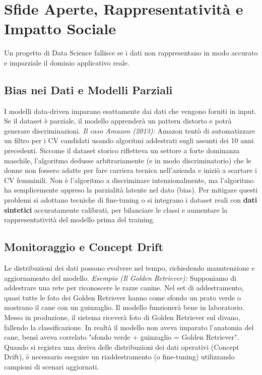 \section{Sfide Aperte, Rappresentatività e Impatto Sociale}
Un progetto di Data Science fallisce se i dati non rappresentano in modo accurato e imparziale il dominio applicativo reale. 

\subsection{Bias nei Dati e Modelli Parziali}
I modelli data-driven imparano esattamente dai dati che vengono forniti in input. Se il dataset è parziale, il modello apprenderà un pattern distorto e potrà generare discriminazioni. 
\textit{Il caso Amazon (2013):} Amazon tentò di automatizzare un filtro per i CV candidati usando algoritmi addestrati sugli assunti dei 10 anni precedenti. Siccome il dataset storico rifletteva un settore a forte dominanza maschile, l'algoritmo dedusse arbitrariamente (e in modo discriminatorio) che le donne non fossero adatte per fare carriera tecnica nell'azienda e iniziò a scartare i CV femminili. Non è l'algoritmo a discriminare intenzionalmente, ma l'algoritmo ha semplicemente appreso la parzialità latente nel dato (bias).
Per mitigare questi problemi si adottano tecniche di fine-tuning o si integrano i dataset reali con \textbf{dati sintetici} accuratamente calibrati, per bilanciare le classi e aumentare la rappresentatività del modello prima del training.

\subsection{Monitoraggio e Concept Drift}
Le distribuzioni dei dati possono evolvere nel tempo, richiedendo manutenzione e aggiornamento del modello. 
\textit{Esempio (Il Golden Retriever):} Supponiamo di addestrare una rete per riconoscere le razze canine. Nel set di addestramento, quasi tutte le foto dei Golden Retriever hanno come sfondo un prato verde o mostrano il cane con un guinzaglio. Il modello funzionerà bene in laboratorio. Messo in produzione, il sistema riceverà foto di Golden Retriever sul divano, fallendo la classificazione. In realtà il modello non aveva imparato l'anatomia del cane, bensì aveva correlato "sfondo verde + guinzaglio = Golden Retriever". Quando si registra una deriva delle distribuzioni dei dati operativi (Concept Drift), è necessario eseguire un riaddestramento (o fine-tuning) utilizzando campioni di scenari aggiornati.

